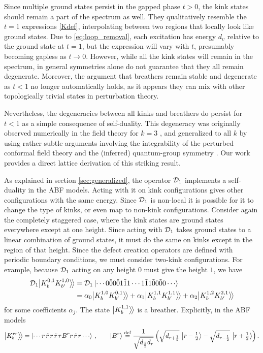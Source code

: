 Since multiple ground states persist in the gapped phase $t>0$, the kink states should remain a part of the spectrum as well. They qualitatively resemble the $t=1$ expressions \eqref{Kdef}, interpolating between two regions that locally look like ground states. Due to \eqref{eq:loop_removal}, each excitation has energy $d_\upsilon$ relative to the ground state at $t=1$, but the expression will vary with $t$, presumably becoming gapless as $t\to 0$. 
However, while all the kink states will remain in the spectrum,  in general symmetries alone do not guarantee that they all remain degenerate. Moreover, the argument that breathers remain stable and degenerate as $t<1$ no longer automatically holds, as it appears they can mix with other topologically trivial states in perturbation theory. 

Nevertheless, the degeneracies between all kinks and breathers do persist for $t<1$ as a simple consequence of self-duality. This degeneracy was originally observed numerically in the field theory for $k=3$  \cite{Lassig1990}, and generalized to all $k$ by using rather subtle arguments involving the integrability of the perturbed conformal field theory and the (inferred) quantum-group symmetry \cite{Lassig1990,Smirnov1991,Chim1991,Dorey2002a,Dorey2002b}. Our work provides a direct lattice derivation of this striking result.



As explained in section \ref{sec:generalized}, the operator $\mathcal{D}_1$ implements a self-duality in the ABF models. Acting with it on kink configurations gives other configurations with the same energy. Since $\mathcal{D}_1$ is non-local it is possible for it to change the type of kinks, or even map to non-kink configurations. Consider again the completely staggered case, where the kink states are ground states everywhere except at one height. Since acting with $\mathcal{D}_1$ takes ground states to a linear combination of ground states, it must do the same on kinks except in the region of that height. Since the defect creation operators are defined with periodic boundary conditions, we must consider two-kink configurations. For example, because $\mathcal{D}_1$ acting on any height $0$ must give the height $1$, we have
\begin{align} \begin{split}
	\mathcal{D}_1 {\big|{K^{0,1}_b K^{1,0}_{b'}}\big\rangle\!\big\rangle} &=
	\mathcal{D}_1 \ket{\cdots 0\tilde{0} 0\tilde{0} 1\tilde{1}1 \cdots 1 \tilde{1}1 \tilde{0} 0\tilde{0} 0 \cdots}
	\\&= \alpha_{0} {\big|{ K^{1,0}_b K^{0,1}_{b'} }\big\rangle\!\big\rangle} + \alpha_{1} {\big|{ K^{1,1}_b K^{1,1}_{b'} }\big\rangle\!\big\rangle} + \alpha_2 {\big|{ K^{1,2}_b K^{2,1}_{b'} }\big\rangle\!\big\rangle}
	\label{D1K01}
\end{split} \end{align}
for some coefficients $\alpha_j$.
The state ${\big|{ K^{1,1}_b }\big\rangle\!\big\rangle}$ is a breather. Explicitly, in the ABF models
\begin{align}
	{\big|{ K^{rr}_b }\big\rangle\!\big\rangle} = \ket{\cdots r \, \tilde{r} \, r \, \tilde{r} \, r \mkern1mu B^r r \, \tilde{r} \, r \cdots} \,,\qquad
	\ket{B^r} \mathrel{\overset{\textrm{def}}{=}} \frac{1}{\sqrt{d_{\frac12}d_{r}}}\left(\sqrt{d_{r+\frac12}}\, \Ket{r-\tfrac{1}{2}} - \sqrt{d_{r-\frac12}}\, \Ket{r+\tfrac{1}{2}}\right) .
\end{align}



